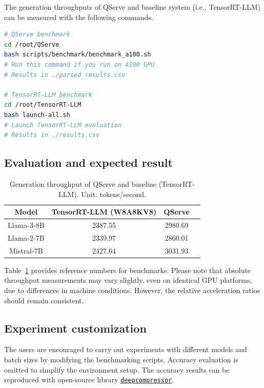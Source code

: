 {The generation throughputs of QServe and baseline system (i.e., TensorRT-LLM) can be measured with the following commands.




\begin{lstlisting}[style=mystyle, language=bash]
# QServe benchmark
cd /root/QServe    
bash scripts/benchmark/benchmark_a100.sh 
# Run this command if you run on A100 GPU
# Results in ./parsed_results.csv

# TensorRT-LLM benchmark
cd /root/TensorRT-LLM   
bash launch-all.sh   
# Launch TensorRT-LLM evaluation
# Results in ./results.csv
\end{lstlisting}


\vspace{-10pt}
\subsection{Evaluation and expected result}
\vspace{-15pt}
\begin{table}[h]
\centering
\caption{Generation throughput of QServe and baseline (TensorRT-LLM). Unit: tokens/second.}
\begin{tabular}{cccc}
\toprule
Model       & TensorRT-LLM (W8A8KV8) & QServe     \\ \midrule
Llama-3-8B  & 2387.55  & 2980.69    \\
Llama-2-7B  & 2339.97  & 2860.01    \\
Mistral-7B  & 2427.64  & 3031.93    \\ \bottomrule
\end{tabular}
\label{appendix:expected_results}
\vspace{-5pt}
\end{table}

Table~\ref{appendix:expected_results} provides reference numbers for \system benchmarks. Please note that absolute throughput measurements may vary slightly, even on identical GPU platforms, due to differences in machine conditions. However, the relative acceleration ratios should remain consistent.



\subsection{Experiment customization}

The users are encouraged to carry out experiments with different models and batch sizes by modifying the benchmarking scripts.
Accuracy evaluation is omitted to simplify the environment setup. The accuracy results can be reproduced with open-source library \href{https://github.com/mit-han-lab/deepcompressor/tree/dev/v0.1.0}{\texttt{deepcompressor}}.


}
